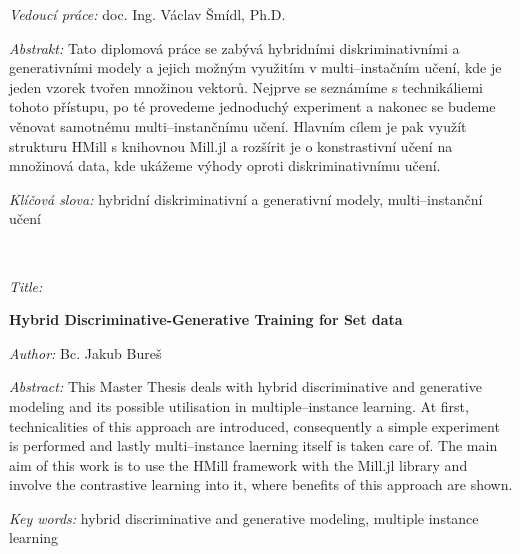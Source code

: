 \bigskip{}

\noindent \emph{Vedoucí práce:} doc. Ing. Václav Šmídl, Ph.D.

\bigskip{}


\noindent \emph{Abstrakt:} Tato diplomová práce se zabývá hybridními diskriminativními a generativními modely a jejich možným využitím v multi--instačním učení, kde je jeden vzorek tvořen množinou vektorů. Nejprve se seznámíme s technikáliemi tohoto přístupu, po té provedeme jednoduchý experiment a nakonec se budeme věnovat samotnému multi--instančnímu učení. Hlavním cílem je pak využít strukturu HMill s knihovnou Mill.jl a rozšírit je o konstrastivní učení na množinová data, kde ukážeme výhody oproti diskriminativnímu učení.

\bigskip{}

\noindent \emph{Klíčová slova:} hybridní diskriminativní a generativní modely, multi--instanční učení

%
\vfill{}
~

\begin{onehalfspace}
\noindent \emph{Title:}

\noindent \textbf{Hybrid Discriminative-Generative Training for Set data}
\end{onehalfspace}

\bigskip{}

\noindent \emph{Author:} Bc. Jakub Bureš

\bigskip{}

\noindent \emph{Abstract:} This Master Thesis deals with hybrid discriminative and generative modeling and its possible utilisation in multiple--instance learning. At first, technicalities of this approach are introduced, consequently a simple experiment is performed and lastly multi--instance laerning itself is taken care of. The main aim of this work is to use the HMill framework with the Mill.jl library and involve the contrastive learning into it, where benefits of this approach are shown. 

\bigskip{}

\noindent \emph{Key words:} hybrid discriminative and generative modeling, multiple instance learning

\newpage{}

\pagestyle{plain}

\tableofcontents{}

\newpage{}
\pagestyle{headings}